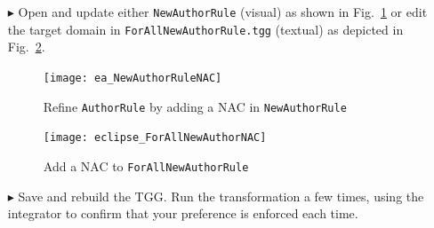 \begin{itemize}

\item[$\blacktriangleright$] Open and update either \texttt{NewAuthorRule} (visual) as shown in Fig.~\ref{ea:existingAuthorNAC} or edit the target domain in 
\texttt{ForAllNewAuthorRule.tgg} (textual) as depicted in Fig.~\ref{eclipse:existingAuthorNAC}.

\newpage

\begin{figure}[htbp]
\begin{center}
  \texttt{[image: ea\_NewAuthorRuleNAC]}
  \caption{Refine \texttt{AuthorRule} by adding a NAC in \texttt{NewAuthorRule}}
  \label{ea:existingAuthorNAC}
\end{center}
\end{figure}

\vspace{0.5cm}

\begin{figure}[htbp]
\begin{center}
  \texttt{[image: eclipse\_ForAllNewAuthorNAC]}
  \caption{Add a NAC to \texttt{ForAllNewAuthorRule}}
  \label{eclipse:existingAuthorNAC}
\end{center}
\end{figure}

\vspace{0.5cm}

\item[$\blacktriangleright$] Save and rebuild the TGG. Run the transformation a few times, using the integrator to confirm that your preference is enforced each
time.

\end{itemize}
